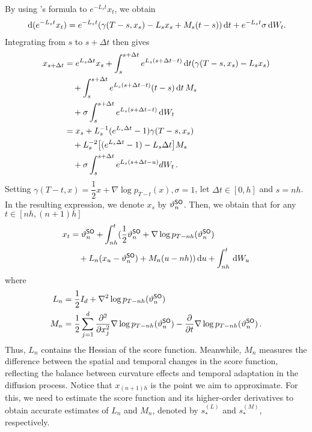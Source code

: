 \documentclass[11pt]{article}
\def\rmd{{\,\rm d}}
\begin{document}
By using 's formula to $e^{-L_st}x_t$, we obtain
\begin{align*}
    \rmd(e^{-L_st}x_t)= e^{-L_st}(\gamma(T-s,x_s)-L_sx_s+M_s(t-s))\rmd t+e^{-L_st}\sigma\rmd W_t.
\end{align*}
Integrating from $s$ to $s+\Delta t$ then gives
\begin{align*}
    x_{s+\Delta t}
    &=e^{L_s\Delta t}x_s+\int_s^{s+\Delta t}e^{L_s(s+\Delta t-t)}\rmd t(\gamma(T-s,x_s)-L_sx_s)\\
    &\quad+\int_s^{s+\Delta t}e^{L_s(s+\Delta t-t)}(t-s)\rmd t\,M_s\\
    &\quad+\sigma\int_s^{s+\Delta t}e^{L_s(s+\Delta t-t)}\rmd W_t\\
    &=x_s+L_s^{-1}(e^{L_s\Delta t}-1)\gamma(T-s,x_s)\\
    &\quad+L_s^{-2}\big[(e^{L_s\Delta t}-1)-L_s\Delta t\big]M_s\\
    &\quad+\sigma\int_s^{s+\Delta t}e^{L_s(s+\Delta t-u)}dW_t\,.
\end{align*}
Setting $\gamma(T-t,x)=\dfrac{1}{2}x+\nabla\log p_{T-t}(x),\sigma=1$, 
let $\Delta t\in[0,h]$ and $s=nh$.
In the resulting expression, we denote $x_{s}$ by $\vartheta_n^{\sf SO}$.
Then, we obtain that for any $t\in[nh,(n+1)h]$
\begin{align}
\label{eq:SOxt}
    x_t&=\vartheta_n^{\sf SO}+\int_{nh}^t(\dfrac{1}{2}\vartheta_n^{\sf SO}+\nabla \log p_{T-nh}(\vartheta_n^{\sf SO})\\
    &\quad +L_n(x_u-\vartheta_n^{\sf SO})+M_n(u-nh))\rmd u+\int_{nh}^{t}\rmd W_u\notag
\end{align}
where
\begin{align*}
    L_n&=\dfrac{1}{2}I_d+\nabla^2\log p_{T-nh}(\vartheta_n^{\sf SO})\\
    M_n&=\dfrac{1}{2}\sum_{j=1}^d\dfrac{\partial^2}{\partial x_j^2}\nabla\log p_{T-nh}(\vartheta_n^{\sf SO})-\dfrac{\partial}{\partial t}\nabla\log p_{T-nh}(\vartheta_n^{\sf SO})\,.
\end{align*}
{Thus, $L_n$ contains the Hessian of the score function.
Meanwhile, $M_n$ measures the difference between the spatial and temporal changes in the score function, reflecting the balance between curvature effects and temporal adaptation in the diffusion process.}
Notice that $x_{(n+1)h}$ is the point we aim to approximate. For this, we need to estimate the score function and its higher-order derivatives to obtain accurate estimates of $L_n$ and $M_ n$, denoted by $s_*^{(L)}$ and $s_*^{(M)}$, respectively.
\end{document}
